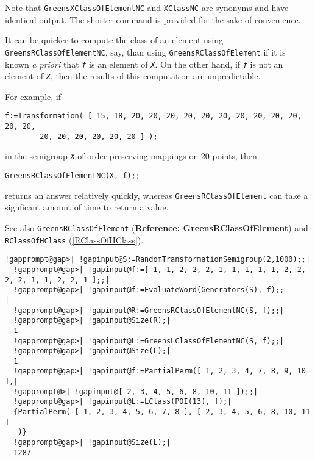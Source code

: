 \documentclass[a4paper,11pt]{report}
\begin{document}
{{{ Note that \texttt{GreensXClassOfElementNC} and \texttt{XClassNC} are synonyms and have identical output. The shorter command is provided for
the sake of convenience. 

 It can be quicker to compute the class of an element using \texttt{GreensRClassOfElementNC}, say, than using \texttt{GreensRClassOfElement} if it is known \emph{a priori} that \mbox{\texttt{\mdseries\slshape f}} is an element of \mbox{\texttt{\mdseries\slshape X}}. On the other hand, if \mbox{\texttt{\mdseries\slshape f}} is not an element of \mbox{\texttt{\mdseries\slshape X}}, then the results of this computation are unpredictable.

 For example, if 
\begin{Verbatim}[commandchars=!@|,fontsize=\small,frame=single,label=Example]
  f:=Transformation( [ 15, 18, 20, 20, 20, 20, 20, 20, 20, 20, 20, 20, 20, 20, 
        20, 20, 20, 20, 20, 20 ] );
\end{Verbatim}
 in the semigroup \mbox{\texttt{\mdseries\slshape X}} of order-preserving mappings on 20 points, then 
\begin{Verbatim}[commandchars=!@|,fontsize=\small,frame=single,label=Example]
  GreensRClassOfElementNC(X, f);;
\end{Verbatim}
 returns an answer relatively quickly, whereas \texttt{GreensRClassOfElement} can take a signficant amount of time to return a value.

 See also \texttt{GreensRClassOfElement} (\textbf{Reference: GreensRClassOfElement}) and \texttt{RClassOfHClass} (\ref{RClassOfHClass}). 
\begin{Verbatim}[commandchars=!@|,fontsize=\small,frame=single,label=Example]
  !gapprompt@gap>| !gapinput@S:=RandomTransformationSemigroup(2,1000);;|
  !gapprompt@gap>| !gapinput@f:=[ 1, 1, 2, 2, 2, 1, 1, 1, 1, 1, 2, 2, 2, 2, 1, 1, 2, 2, 1 ];;|
  !gapprompt@gap>| !gapinput@f:=EvaluateWord(Generators(S), f);;                            |
  !gapprompt@gap>| !gapinput@R:=GreensRClassOfElementNC(S, f);;|
  !gapprompt@gap>| !gapinput@Size(R);|
  1
  !gapprompt@gap>| !gapinput@L:=GreensLClassOfElementNC(S, f);;|
  !gapprompt@gap>| !gapinput@Size(L);|
  1
  !gapprompt@gap>| !gapinput@f:=PartialPerm([ 1, 2, 3, 4, 7, 8, 9, 10 ],|
  !gapprompt@>| !gapinput@[ 2, 3, 4, 5, 6, 8, 10, 11 ]);;|
  !gapprompt@gap>| !gapinput@L:=LClass(POI(13), f);|
  {PartialPerm( [ 1, 2, 3, 4, 5, 6, 7, 8 ], [ 2, 3, 4, 5, 6, 8, 10, 11 ]
   )}
  !gapprompt@gap>| !gapinput@Size(L);|
  1287
\end{Verbatim}
 }

}}
\end{document}
